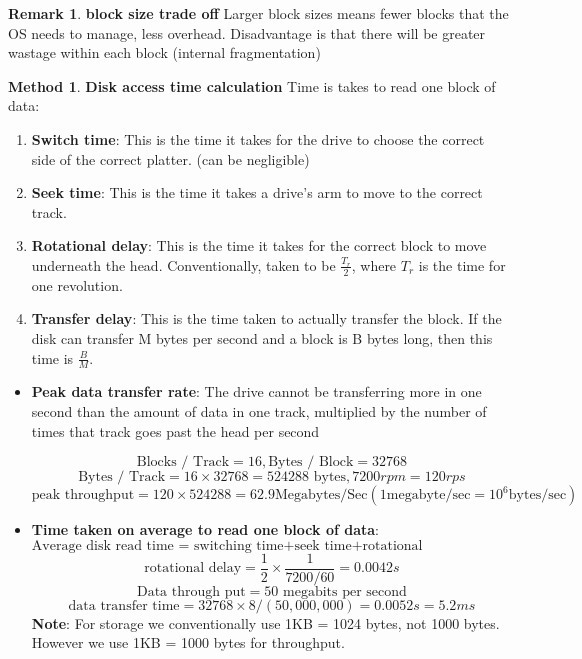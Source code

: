 \documentclass[11pt,a4paper]{article}
\theoremstyle{definition}
\newtheorem*{remark}{Remark}
\newtheorem{method}{Method}[section]
\newenvironment{myitemize}
{ \begin{itemize}
    \setlength{\itemsep}{5pt}
    \setlength{\parskip}{0pt}
    \setlength{\parsep}{0pt}     }
{ \end{itemize}                  }
\newenvironment{myenumerate}
{ \begin{enumerate}
    \setlength{\itemsep}{5pt}
    \setlength{\parskip}{0pt}
    \setlength{\parsep}{0pt}     }
{ \end{enumerate}                }
\begin{document}
\begin{remark}{\textbf{block size trade off}}
	Larger block sizes means fewer blocks that the OS needs to manage, less overhead. Disadvantage is that there will be greater wastage within each block (internal fragmentation)
\end{remark}

\begin{method}{\textbf{Disk access time calculation}} Time is takes to read one block of data:

\begin{myenumerate}
	\item \textbf{Switch time}: This is the time it takes for the drive to choose the correct side of the correct platter. (can be negligible)
	\item \textbf{Seek time}: This is the time it takes a drive's arm to move to the correct track.
	\item \textbf{Rotational delay}: This is the time it takes for the correct block to move underneath the head. Conventionally, taken to be $\frac{T_r}{2}$, where $T_r$ is the time for one revolution.
	\item \textbf{Transfer delay}: This is the time taken to actually transfer the block. If the disk can transfer M bytes per second and a block is B bytes long, then this time is $\frac{B}{M}$.
\end{myenumerate}

\begin{myitemize}
	\item \textbf{Peak data transfer rate}: The drive cannot be transferring more in one second than the amount of data in one track, multiplied by the number of times that track goes past the head per second
	
	\[ \text{Blocks / Track} = 16, \text{Bytes / Block} = 32768 \]
	\[\text{Bytes / Track} = 16 \times 32768=524288 \text{ bytes},  7200rpm=120rps \]
	\[\text{peak throughput}= 120 \times 524288= 62.9 \text{Megabytes/Sec} (1 \text{megabyte/sec} = 10^6 \text{bytes/sec}) \]
	
	\item \textbf{Time taken on average to read one block of data}:
	\[ \text{Average disk read time =  switching time+seek time+rotational delay+transfer time}\]
	\[\text{rotational delay}=\frac{1}{2} \times \frac{1}{7200/60}=0.0042s \]
	\[\text{Data through put} = 50 \text{ megabits per second} \]
	\[\text{data transfer time}=32768\times 8 / (50,000,000)= 0.0052s = 5.2ms \]
	\textbf{Note}: For storage we conventionally use 1KB = 1024 bytes, not 1000 bytes. However we use 1KB = 1000 bytes for throughput.
\end{myitemize}

\end{method}
\end{document}
